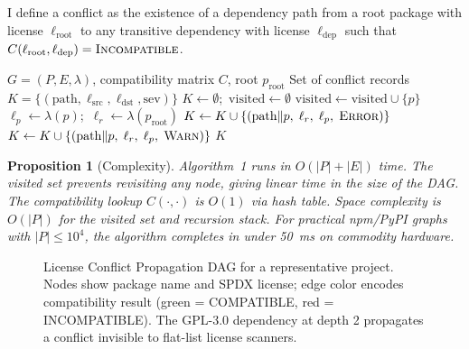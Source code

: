 \documentclass[11pt,twocolumn]{article}
\newtheorem{proposition}{Proposition}
\begin{document}
I define a conflict as the existence of a dependency path from a root package
with license $\ell_\mathrm{root}$ to any transitive dependency with license
$\ell_\mathrm{dep}$ such that $C(\ell_\mathrm{root}, \ell_\mathrm{dep}) =
\textsc{Incompatible}$.

\begin{algorithm}[H]
\caption{License Conflict Propagation (LCP)}
\begin{algorithmic}[1]
\Require $G = (P, E, \lambda)$, compatibility matrix $C$, root $p_\mathrm{root}$
\Ensure Set of conflict records $K = \{(\mathrm{path}, \ell_\mathrm{src}, \ell_\mathrm{dst}, \mathrm{sev})\}$
\State $K \gets \emptyset$;\ $\mathrm{visited} \gets \emptyset$
   \Return \EndIf
  \State $\mathrm{visited} \gets \mathrm{visited} \cup \{p\}$
  \State $\ell_p \gets \lambda(p)$;\ $\ell_r \gets \lambda(p_\mathrm{root})$
    \State $K \gets K \cup \{(\mathrm{path} \| p,\; \ell_r,\; \ell_p,\; \textsc{Error})\}$
    \State $K \gets K \cup \{(\mathrm{path} \| p,\; \ell_r,\; \ell_p,\; \textsc{Warn})\}$
  \EndIf
    \State {}
  \EndFor
\EndFunction
\State {}
\State \Return $K$
\end{algorithmic}
\end{algorithm}

\begin{proposition}[Complexity]
Algorithm~1 runs in $O(|P| + |E|)$ time. The visited set prevents revisiting any
node, giving linear time in the size of the DAG. The compatibility lookup
$C(\cdot,\cdot)$ is $O(1)$ via hash table. Space complexity is $O(|P|)$ for the
visited set and recursion stack. For practical npm/PyPI graphs with
$|P| \le 10^4$, the algorithm completes in under 50~ms on commodity hardware.
\end{proposition}

\begin{figure}[t]
  \centering
  
  \caption{License Conflict Propagation DAG for a representative project. Nodes
  show package name and SPDX license; edge color encodes compatibility result
  (green = COMPATIBLE, red = INCOMPATIBLE). The GPL-3.0 dependency at depth 2
  propagates a conflict invisible to flat-list license scanners.}
  \label{fig:licensedag}
\end{figure}
\end{document}
